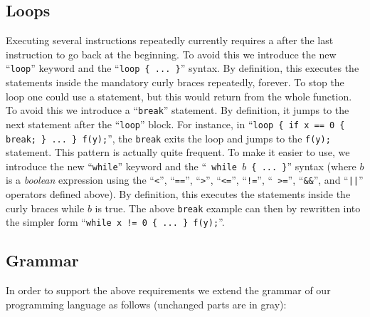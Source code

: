 \subsection{Loops}

Executing several instructions repeatedly currently requires a 
after the last instruction to go back at the beginning. To avoid this we
introduce the new ``{\tt loop}'' keyword and the ``{\tt loop \{ ... \}}''
syntax. By definition, this executes the statements inside the mandatory curly
braces repeatedly, forever. To stop the loop one could use a 
statement, but this would return from the whole function. To avoid this we
introduce a ``{\tt break}'' statement. By definition, it jumps to the next
statement after the ``{\tt loop}'' block. For instance, in ``{\tt loop \{ if x
== 0 \{ break; \} ... \} f(y);}'', the {\tt break} exits the loop and jumps to
the {\tt f(y);} statement. This pattern is actually quite frequent. To make it
easier to use, we introduce the new ``{\tt while}'' keyword and the ``{\tt
while $b$ \{ ... \}}'' syntax (where $b$ is a {\em boolean} expression using
the ``{\tt <}'', ``{\tt ==}'', ``{\tt >}'', ``{\tt <=}'', ``{\tt !=}'', ``{\tt
>=}'', ``{\tt \&\&}'', and ``{\tt ||}'' operators defined above). By
definition, this executes the statements inside the curly braces while $b$ is
true. The above {\tt break} example can then by rewritten into the simpler
form ``{\tt while x != 0 \{ ... \} f(y);}''.

\subsection{Grammar}

In order to support the above requirements we extend the grammar of our
programming language as follows (unchanged parts are in gray):

